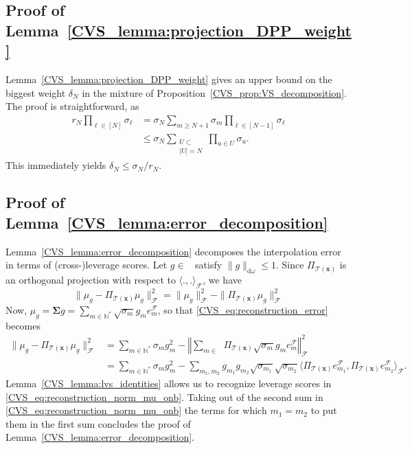 \documentclass[twoside,11pt]{book}
\numberwithin{theorem}{chapter}
\numberwithin{definition}{chapter}
\numberwithin{proposition}{chapter}
\numberwithin{corollary}{chapter}
\numberwithin{example}{chapter}
\numberwithin{lemma}{chapter}
\numberwithin{assumption}{chapter}
\DeclareMathOperator{\F}{\mathcal{F}}
\DeclareMathOperator{\Ltwo}{\mathbb{L}_{2}(\mathrm{d} \omega)}
\DeclareMathOperator{\Ns}{\mathbb{N}^{*}}
\begin{document}
\subsection{Proof of Lemma~\ref{CVS_lemma:projection_DPP_weight}}
Lemma~\ref{CVS_lemma:projection_DPP_weight} gives an upper bound on the biggest weight $\delta_N$ in the mixture of Proposition~\ref{CVS_prop:VS_decomposition}. The proof is straightforward, as
\begin{align}\label{CVS_eq:r_N_delta_N_inequality}
r_{N} \prod\limits_{\ell \in [N]} \sigma_{\ell} & = \sigma_{N} \sum\limits_{m \geq N+1} \sigma_{m} \prod\limits_{\ell \in [N-1]} \sigma_{\ell} \nonumber\\
& \leq \sigma_{N} \sum\limits_{\substack{U \subset \Ns\\ |U| = N}} \prod\limits_{u \in U} \sigma_{u}.
\end{align}
This immediately yields $\delta_{N} \leq \sigma_{N}/r_{N}$.

\subsection{Proof of Lemma~\ref{CVS_lemma:error_decomposition}}\label{CVS_app:proof_error_decomposition}
Lemma~\ref{CVS_lemma:error_decomposition} decomposes the interpolation error in terms of (cross-)leverage scores. Let $g \in \Ltwo$ satisfy $\|g\|_{\mathrm{d}\omega} \leq 1$. Since $\Pi_{\mathcal{T}(\bm{x})}$ is an orthogonal projection with respect to $\langle .,. \rangle_{\F}$, we have
\begin{equation}\label{CVS_eq:reconstruction_error}
\|\mu_{g} - \Pi_{\mathcal{T}(\bm{x})} \mu_{g}\|_{\F}^{2} = \|\mu_{g}\|_{\F}^{2} - \| \Pi_{\mathcal{T}(\bm{x})} \mu_{g}\|_{\F}^2
\end{equation}
Now, $\mu_{g} = \bm{\Sigma} g = \sum\limits_{m \in \mathbb{N}^{*}} \sqrt{\sigma_{m}} g_{m} e_{m}^{\F}$, so that \eqref{CVS_eq:reconstruction_error} becomes
\begin{align}
\|\mu_{g} - \Pi_{\mathcal{T}(\bm{x})} \mu_{g}\|_{\F}^{2} & = \sum\limits_{m \in \mathbb{N}^{*}} \sigma_{m} g_{m}^{2} - \left\Vert \sum_{m \in \Ns} \Pi_{\mathcal{T}(\bm{x})}  \sqrt{\sigma_{m}} g_{m} e_{m}^{\F}\right\Vert_{\F}^2 \nonumber\\
& = \sum\limits_{m \in \mathbb{N}^{*}} \sigma_{m} g_{m}^{2} - \sum\limits_{m_{1}, m_2} g_{m_{1}} g_{m_{2}} \sqrt{\sigma_{m_{1}}} \sqrt{\sigma_{m_{2}}} \langle  \Pi_{\mathcal{T}(\bm{x})}   e_{m_{1}}^{\F}, \Pi_{\mathcal{T}(\bm{x})} e_{m_{2}}^{\F} \rangle_{\F}. \label{CVS_eq:reconstruction_norm_mu_onb}
\end{align}
Lemma~\ref{CVS_lemma:lvs_identities} allows us to recognize leverage scores in \eqref{CVS_eq:reconstruction_norm_mu_onb}. Taking out of the second sum in \eqref{CVS_eq:reconstruction_norm_mu_onb} the terms for which $m_1=m_2$ to put them in the first sum concludes the proof of Lemma~\ref{CVS_lemma:error_decomposition}.
\end{document}

